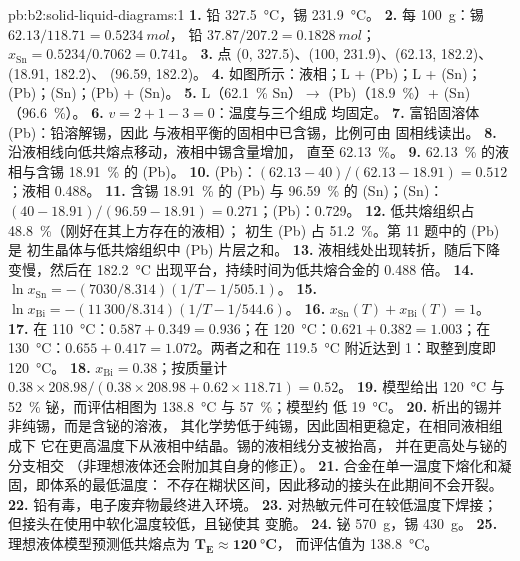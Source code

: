 \begin{solution}{pb:b2:solid-liquid-diagrams:1}
\textbf{1.} 铅 \qty{327.5}{\degreeCelsius}，锡 \qty{231.9}{\degreeCelsius}。
\textbf{2.} 每 \qty{100}{g}：锡 $62.13/118.71 = \qty{0.5234}{mol}$，
铅 $37.87/207.2 = \qty{0.1828}{mol}$；$x_{\mathrm{Sn}} = 0.5234/0.7062 =
0.741$。
\textbf{3.} 点 (0, 327.5)、(100, 231.9)、(62.13, 182.2)、(18.91, 182.2)、
(96.59, 182.2)。
\textbf{4.} 如图所示：液相；L + (Pb)；L + (Sn)；(Pb)；(Sn)；(Pb) + (Sn)。
\textbf{5.} L（62.1~\% Sn）$\longrightarrow$ (Pb)（18.9~\%）+ (Sn)（96.6~\%）。
\textbf{6.} $v = 2 + 1 - 3 = 0$：温度与三个组成
均固定。
\textbf{7.} 富铅固溶体 (Pb)：铅溶解锡，因此
与液相平衡的固相中已含锡，比例可由
固相线读出。
\textbf{8.} 沿液相线向低共熔点移动，液相中锡含量增加，
直至 62.13~\%。
\textbf{9.} 62.13~\% 的液相与含锡 18.91~\% 的 (Pb)。
\textbf{10.} (Pb)：$(62.13 - 40)/(62.13 - 18.91) = 0.512$；液相 0.488。
\textbf{11.} 含锡 18.91~\% 的 (Pb) 与 96.59~\% 的 (Sn)；(Sn)：$(40 - 18.91)/(96.59 -
18.91) = 0.271$；(Pb)：0.729。
\textbf{12.} 低共熔组织占 48.8~\%（刚好在其上方存在的液相）；
初生 (Pb) 占 51.2~\%。第 11 题中的 (Pb) 是
初生晶体与低共熔组织中 (Pb) 片层之和。
\textbf{13.} 液相线处出现转折，随后下降变慢，然后在
\qty{182.2}{\degreeCelsius} 出现平台，持续时间为低共熔合金的 0.488 倍。
\textbf{14.} $\ln x_{\mathrm{Sn}} = -(7030/8.314)(1/T - 1/505.1)$。
\textbf{15.} $\ln x_{\mathrm{Bi}} = -(11\,300/8.314)(1/T - 1/544.6)$。
\textbf{16.} $x_{\mathrm{Sn}}(T) + x_{\mathrm{Bi}}(T) = 1$。
\textbf{17.} 在 \qty{110}{\degreeCelsius}：$0.587 + 0.349 = 0.936$；在
\qty{120}{\degreeCelsius}：$0.621 + 0.382 = 1.003$；在
\qty{130}{\degreeCelsius}：$0.655 + 0.417 = 1.072$。两者之和在
\qty{119.5}{\degreeCelsius} 附近达到 1：取整到度即 \qty{120}{\degreeCelsius}。
\textbf{18.} $x_{\mathrm{Bi}} = 0.38$；按质量计 $0.38 \times 208.98/(0.38 \times
208.98 + 0.62 \times 118.71) = 0.52$。
\textbf{19.} 模型给出 \qty{120}{\degreeCelsius} 与 52~\% 铋，而评估相图为
\qty{138.8}{\degreeCelsius} 与 57~\%；模型约
低 \qty{19}{\degreeCelsius}。
\textbf{20.} 析出的锡并非纯锡，而是含铋的溶液，
其化学势低于纯锡，因此固相更稳定，在相同液相组成下
它在更高温度下从液相中结晶。锡的液相线分支被抬高，
并在更高处与铋的分支相交
（非理想液体还会附加其自身的修正）。
\textbf{21.} 合金在单一温度下熔化和凝固，即体系的最低温度：
不存在糊状区间，因此移动的接头在此期间不会开裂。
\textbf{22.} 铅有毒，电子废弃物最终进入环境。
\textbf{23.} 对热敏元件可在较低温度下焊接；
但接头在使用中软化温度较低，且铋使其
变脆。
\textbf{24.} 铋 \qty{570}{g}，锡 \qty{430}{g}。
\textbf{25.} 理想液体模型预测低共熔点为 $\boldsymbol{T_E
\approx \qty{120}{\degreeCelsius}}$，
而评估值为 \qty{138.8}{\degreeCelsius}。
\end{solution}

